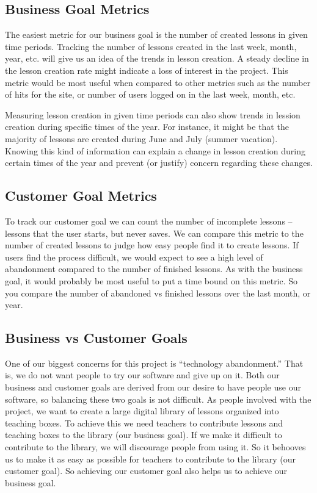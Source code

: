 \documentclass[10pt,letter]{article}
\begin{document}
\subsection{Business Goal Metrics}
The easiest metric for our business goal is the number of created lessons in
given time periods. Tracking the number of lessons created in the last week,
month, year, etc. will give us an idea of the trends in lesson creation. A
steady decline in the lesson creation rate might indicate a loss of interest in
the project. This metric would be most useful when compared to other metrics
such as the number of hits for the site, or number of users logged on in the
last week, month, etc.

Measuring lesson creation in given time periods can also show trends in lession
creation during specific times of the year. For instance, it might be that the
majority of lessons are created during June and July (summer vacation). Knowing
this kind of information can explain a change in lesson creation during certain
times of the year and prevent (or justify) concern regarding these changes.

\subsection{Customer Goal Metrics}
To track our customer goal we can count the number of incomplete lessons --
lessons that the user starts, but never saves. We can compare this metric to the
number of created lessons to judge how easy people find it to create lessons.
If users find the process difficult, we would expect to see a high level of
abandonment compared to the number of finished lessons. As with the business
goal, it would probably be most useful to put a time bound on this metric. So
you compare the number of abandoned vs finished lessons over the last month, or
year.

\subsection{Business vs Customer Goals}
One of our biggest concerns for this project is ``technology abandonment.'' That
is, we do not want people to try our software and give up on it. Both our
business and customer goals are derived from our desire to have people use our
software, so balancing these two goals is not difficult. As people involved with
the project, we want to create a large digital library of lessons organized into
teaching boxes. To achieve this we need teachers to contribute lessons and
teaching boxes to the library (our business goal). If we make it difficult to
contribute to the library, we will discourage people from using it. So it
behooves us to make it as easy as possible for teachers to contribute to the
library (our customer goal). So achieving our customer goal also helps us to
achieve our business goal.
\end{document}
